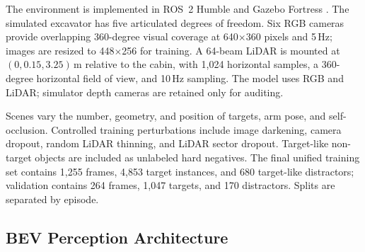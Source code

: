 \documentclass[conference]{IEEEtran}
\begin{document}
The environment is implemented in ROS~2 Humble and Gazebo Fortress \cite{ros2humble,gazebofortress}. The simulated excavator has five articulated degrees of freedom. Six RGB cameras provide overlapping 360-degree visual coverage at 640$\times$360 pixels and 5\,Hz; images are resized to 448$\times$256 for training. A 64-beam LiDAR is mounted at $(0,0.15,3.25)$\,m relative to the cabin, with 1,024 horizontal samples, a 360-degree horizontal field of view, and 10\,Hz sampling. The model uses RGB and LiDAR; simulator depth cameras are retained only for auditing.

Scenes vary the number, geometry, and position of targets, arm pose, and self-occlusion. Controlled training perturbations include image darkening, camera dropout, random LiDAR thinning, and LiDAR sector dropout. Target-like non-target objects are included as unlabeled hard negatives. The final unified training set contains 1,255 frames, 4,853 target instances, and 680 target-like distractors; validation contains 264 frames, 1,047 targets, and 170 distractors. Splits are separated by episode.

\subsection{BEV Perception Architecture}
\end{document}
